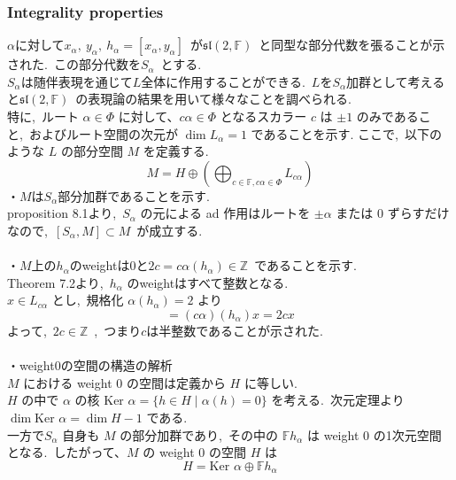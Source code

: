 \documentclass[uplatex,dvipdfmx]{jsarticle}
\begin{document}
\subsubsection{Integrality properties}
$\alpha$に対して$x_\alpha,~y_\alpha,~h_\alpha = [x_\alpha, y_\alpha]$~が$\mathfrak{sl}(2,\mathbb{F})$~と同型な部分代数を張ることが示された.~この部分代数を$S_\alpha$~とする.\\
$S_\alpha$は随伴表現を通じて$L$全体に作用することができる.~$L$を$S_\alpha$加群として考えると$\mathfrak{sl}(2,\mathbb{F})$~の表現論の結果を用いて様々なことを調べられる.\\
特に,~ルート $\alpha \in \Phi$ に対して、$c\alpha \in \Phi$ となるスカラー $c$ は $\pm 1$ のみであること,~およびルート空間の次元が $\dim L_\alpha = 1$ であることを示す.
ここで,~以下のような $L$ の部分空間 $M$ を定義する.
\begin{equation*}
    M = H \oplus \left( \bigoplus_{c \in \mathbb{F}, c\alpha \in \Phi} L_{c\alpha} \right)
\end{equation*}
・$M$は$S_\alpha$部分加群であることを示す.\\
proposition 8.1より,~$S_\alpha$ の元による ad 作用はルートを $\pm \alpha$ または $0$ ずらすだけなので,~$[S_\alpha, M] \subset M$~が成立する.\\\\
・$M$上の$h_\alpha$のweightは0と$2c = c \alpha(h_\alpha) \in \mathbb{Z}$~であることを示す.\\
Theorem 7.2より,~$h_\alpha$ のweightはすべて整数となる.~\\
$x \in L_{c\alpha}$ とし,~規格化 $\alpha(h_\alpha)=2$ より
\begin{equation*}
    [h_\alpha ,x] = (c\alpha)(h_\alpha) x = 2c x
\end{equation*}
よって,~$2c \in \mathbb{Z}$~,~つまり$c$は半整数であることが示された.\\\\
・weight$0$の空間の構造の解析\\
$M$ における weight 0 の空間は定義から $H$ に等しい.\\
$H$ の中で $\alpha$ の核 $\text{Ker } \alpha = \{ h \in H \mid \alpha(h) = 0 \}$ を考える.~次元定理より $\dim \text{Ker } \alpha = \dim H - 1$ である.\\
一方で$S_\alpha$ 自身も $M$ の部分加群であり,~その中の $\mathbb{F}h_\alpha$ は weight 0 の1次元空間となる.~したがって、$M$ の weight 0 の空間 $H$ は
\begin{equation*}
    H = \text{Ker } \alpha \oplus \mathbb{F} h_\alpha
\end{equation*}
\end{document}
